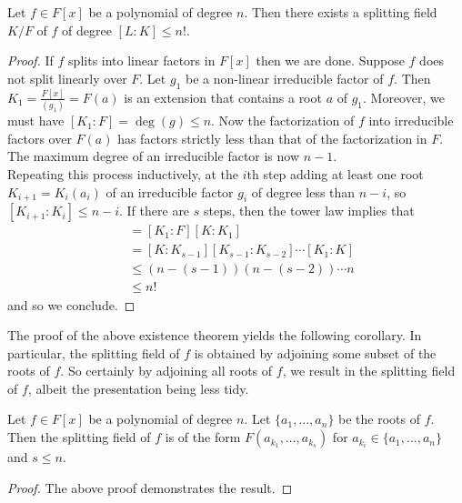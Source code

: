 \documentclass[a4paper]{article}
\begin{document}
\begin{thm}{}{} Let $f\in F[x]$ be a polynomial of degree $n$. Then there exists a splitting field $K/F$ of $f$ of degree $[L:K]\leq n!$. 
\begin{proof}
If $f$ splits into linear factors in $F[x]$ then we are done. Suppose $f$ does not split linearly over $F$. Let $g_1$ be a non-linear irreducible factor of $f$. Then $K_1=\frac{F[x]}{(g_1)}=F(a)$ is an extension that contains a root $a$ of $g_1$. Moreover, we must have $[K_1:F]=\deg(g)\leq n$. Now the factorization of $f$ into irreducible factors over $F(a)$ has factors strictly less than that of the factorization in $F$. The maximum degree of an irreducible factor is now $n-1$. \\

Repeating this process inductively, at the $i$th step adding at least one root $K_{i+1}=K_i(a_i)$ of an irreducible factor $g_i$ of degree less than $n-i$, so $[K_{i+1}:K_i]\leq n-i$. If there are $s$ steps, then the tower law implies that 
\begin{align*}
[K:F]&=[K_1:F][K:K_1]\\
&=[K:K_{s-1}][K_{s-1}:K_{s-2}]\cdots[K_1:K]\\
&\leq (n-(s-1))(n-(s-2))\cdots n\\
&\leq n!
\end{align*}
and so we conclude. 
\end{proof}
\end{thm}

The proof of the above existence theorem yields the following corollary. In particular, the splitting field of $f$ is obtained by adjoining some subset of the roots of $f$. So certainly by adjoining all roots of $f$, we result in the splitting field of $f$, albeit the presentation being less tidy. 

\begin{crl}{}{} Let $f\in F[x]$ be a polynomial of degree $n$. Let $\{a_1,\dots,a_n\}$ be the roots of $f$. Then the splitting field of $f$ is of the form $F(a_{k_1},\dots,a_{k_s})$ for $a_{k_i}\in\{a_1,\dots,a_n\}$ and $s\leq n$. 
\begin{proof}
The above proof demonstrates the result. 
\end{proof}
\end{crl}
\end{document}
